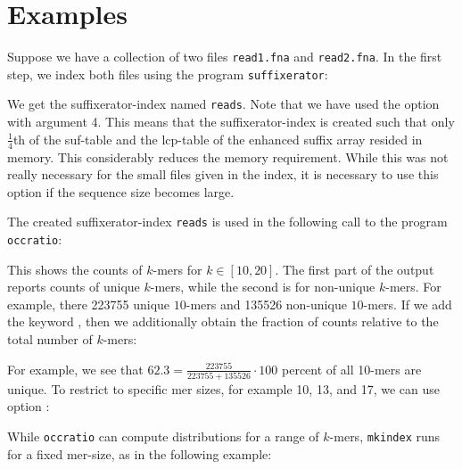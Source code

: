 \documentclass[12pt]{article}
\newcommand{\Programname}[1]{\texttt{\small #1}}
\newcommand{\TYmkindex}[0]{\Programname{mkindex}\xspace}
\newcommand{\TYoccratio}[0]{\Programname{occratio}\xspace}
\newcommand{\SFX}[0]{\Programname{suffixerator}\xspace}
\begin{document}
\section{Examples}\label{Examples}

Suppose we have a collection of two files \texttt{read1.fna} and
\texttt{read2.fna}. In the first step, we index 
both files using the program \SFX:


We get the suffixerator-index named \texttt{reads}. Note that we have
used the option  with argument 4. This means that 
the suffixerator-index is created such that only $\frac{1}{4}$th of the
\textsf{suf}-table and the \textsf{lcp}-table of the enhanced suffix array
resided in memory. This considerably reduces the memory requirement.
While this was not really necessary for the small files given in the
index, it is necessary to use this option if the sequence size becomes large.

The created suffixerator-index \texttt{reads} 
is used in the following call to the program \TYoccratio:


This shows the counts of $k$-mers for $k\in[10,20]$. The first part of the
output reports counts of unique $k$-mers, while the second is for
non-unique $k$-mers. For example, there 223755 unique $10$-mers 
and 135526 non-unique $10$-mers. If we add the keyword 
, then we additionally obtain the fraction
of counts relative to the total number of $k$-mers:


For example, we see that $62.3=\frac{223755}{223755+135526}\cdot 100$
percent of all 10-mers are unique. To restrict to specific mer sizes, for
example 10, 13, and 17, we can use option :


While \TYoccratio can compute distributions for a range of 
$k$-mers, \TYmkindex runs for a fixed mer-size, as in the following example:

\end{document}
